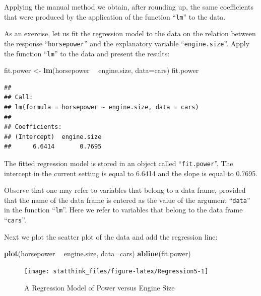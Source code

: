 \documentclass[
]{krantz}
\makeatletter
\newenvironment{Shaded}{\begin{snugshade}}{\end{snugshade}}
\newcommand{\DataTypeTok}[1]{\textcolor[rgb]{0.13,0.29,0.53}{#1}}
\newcommand{\KeywordTok}[1]{\textcolor[rgb]{0.13,0.29,0.53}{\textbf{#1}}}
\newcommand{\NormalTok}[1]{#1}
\newcommand{\OperatorTok}[1]{\textcolor[rgb]{0.81,0.36,0.00}{\textbf{#1}}}
\newcommand{\StringTok}[1]{\textcolor[rgb]{0.31,0.60,0.02}{#1}}
\newenvironment{kframe}{%
\medskip{}
\setlength{\fboxsep}{.8em}
 \def\at@end@of@kframe{}%
 \ifinner\ifhmode%
  \def\at@end@of@kframe{\end{minipage}}%
  \begin{minipage}{\columnwidth}%
 \fi\fi%
 \def\FrameCommand##1{\hskip\@totalleftmargin \hskip-\fboxsep
 \colorbox{shadecolor}{##1}\hskip-\fboxsep
     \hskip-\linewidth \hskip-\@totalleftmargin \hskip\columnwidth}%
 \MakeFramed {\advance\hsize-\width
   \@totalleftmargin\z@ \linewidth\hsize
   \@setminipage}}%
 {\par\unskip\endMakeFramed%
 \at@end@of@kframe}
\renewenvironment{Shaded}{\begin{kframe}}{\end{kframe}}
\theoremstyle{definition}
\theoremstyle{definition}
\theoremstyle{definition}
\theoremstyle{remark}
\makeatother
\begin{document}
Applying the manual method we obtain, after rounding up, the same
coefficients that were produced by the application of the function
``\texttt{lm}'' to the data.

As an exercise, let us fit the regression model to the data on the
relation between the response ``\texttt{horsepower}'' and the explanatory
variable ``\texttt{engine.size}''. Apply the function ``\texttt{lm}'' to the data and
present the results:

\begin{Shaded}
\begin{Highlighting}[]
\NormalTok{fit.power <-}\StringTok{ }\KeywordTok{lm}\NormalTok{(horsepower }\OperatorTok{~}\StringTok{ }\NormalTok{engine.size, }\DataTypeTok{data=}\NormalTok{cars)}
\NormalTok{fit.power}
\end{Highlighting}
\end{Shaded}

\begin{verbatim}
## 
## Call:
## lm(formula = horsepower ~ engine.size, data = cars)
## 
## Coefficients:
## (Intercept)  engine.size  
##      6.6414       0.7695
\end{verbatim}

The fitted regression model is stored in an object called ``\texttt{fit.power}''.
The intercept in the current setting is equal to 6.6414 and the slope is
equal to 0.7695.

Observe that one may refer to variables that belong to a data frame,
provided that the name of the data frame is entered as the value of the
argument ``\texttt{data}'' in the function ``\texttt{lm}''. Here we refer to variables
that belong to the data frame ``\texttt{cars}''.

Next we plot the scatter plot of the data and add the regression line:

\begin{Shaded}
\begin{Highlighting}[]
\KeywordTok{plot}\NormalTok{(horsepower }\OperatorTok{~}\StringTok{ }\NormalTok{engine.size, }\DataTypeTok{data=}\NormalTok{cars)}
\KeywordTok{abline}\NormalTok{(fit.power)}
\end{Highlighting}
\end{Shaded}

\begin{figure}

{\centering \texttt{[image: statthink\_files/figure-latex/Regression5-1]} 

}

\caption{A Regression Model of Power versus Engine Size}\label{fig:Regression5}
\end{figure}
\end{document}
